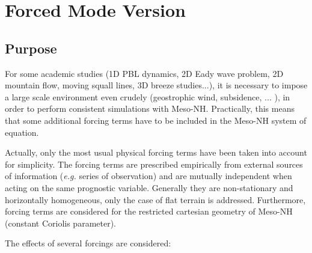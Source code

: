 %
%
\def\souligne#1{$\underline{\smash{\hbox{#1}}}$}
%
%

\chapter{Forced Mode Version}
\minitoc

\section{Purpose}
For some academic studies (1D PBL dynamics, 2D Eady wave problem, 2D mountain
flow, moving squall lines, 3D breeze studies...), it is necessary to impose a
large scale environment even crudely (geostrophic wind, subsidence, ... ), in
order to perform consistent simulations with Meso-NH. Practically, this means
that some additional forcing terms have to be included in the Meso-NH system of
equation.

Actually, only the most usual physical forcing terms have been taken into
account for simplicity. The forcing terms are prescribed empirically from
external sources of information ({\it e.g.} series of observation) and are
mutually independent when acting on the same prognostic variable. Generally
they are non-stationary and horizontally homogeneous, only the case of
flat terrain is addressed. Furthermore, forcing terms are considered for
the restricted cartesian geometry of Meso-NH (constant Coriolis parameter).

The effects of several forcings are considered:

